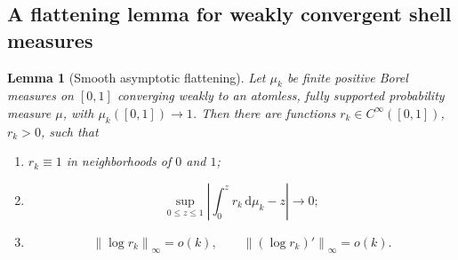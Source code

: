 \documentclass[11pt]{article}
\newtheorem{lemma}[theorem]{Lemma}
\theoremstyle{definition}
\theoremstyle{remark}
\newcommand{\dd}{\,\mathrm d}
\newcommand{\norm}[1]{\left\lVert#1\right\rVert}
\begin{document}
\subsection{A flattening lemma for weakly convergent shell measures}

\begin{lemma}[Smooth asymptotic flattening]
\label{lem:flattening}
Let \(\mu_k\) be finite positive Borel measures on \([0,1]\) converging weakly
to an atomless, fully supported probability measure \(\mu\), with
\(\mu_k([0,1])\to1\).  Then there are functions
\(r_k\in C^\infty([0,1])\), \(r_k>0\), such that
\begin{enumerate}[label=\textup{(\alph*)}]
\item \(r_k\equiv1\) in neighborhoods of \(0\) and \(1\);
\item
\begin{equation}
 \sup_{0\le z\le1}
 \left|\int_0^zr_k\dd\mu_k-z\right|\longrightarrow0;
 \label{eq:flattening-cdf}
\end{equation}
\item
\begin{equation}
 \norm{\log r_k}_\infty=o(k),
 \qquad
 \norm{(\log r_k)'}_\infty=o(k).
 \label{eq:flattening-slopes}
\end{equation}
\end{enumerate}
\end{lemma}
\end{document}
